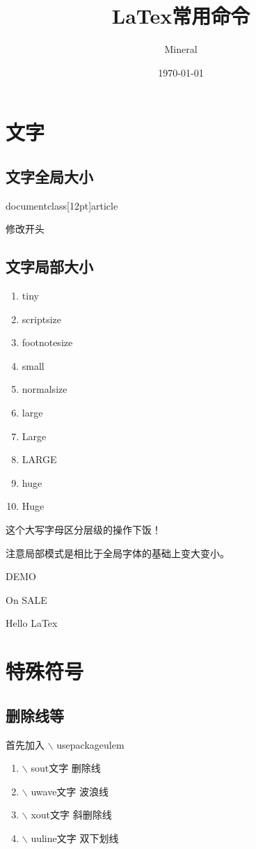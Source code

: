 \documentclass[utf8]{ctexart}
\author{Mineral}
\title{LaTex常用命令}
\date {\today}
\begin{document}
		\maketitle
	    \section{文字}
	    \subsection{文字全局大小}
	    \par documentclass[12pt]{article}	
		\par 修改开头
		\subsection{文字局部大小}
		\begin{enumerate}
				\item tiny
				\item scriptsize
				\item footnotesize
				\item small
				\item normalsize
				\item large
				\item Large
				\item LARGE
				\item huge
				\item Huge									
		\end{enumerate}
		\par 这个大写字母区分层级的操作下饭！
		\par 注意局部模式是相比于全局字体的基础上变大变小。
	    \par \LARGE DEMO
	    \par \Large On SALE	
	    \par \huge Hello LaTex
		\normalsize
		\section{特殊符号}
		\subsection{删除线等}
		\par 首先加入 $\backslash$ usepackage{ulem}
		\begin{enumerate}
				\item $\backslash$ sout{文字} 删除线
				\item $\backslash$ uwave{文字} 波浪线	
				\item $\backslash$ xout{文字} 斜删除线
				\item $\backslash$ uuline{文字} 双下划线		
		\end{enumerate}
\end{document}
